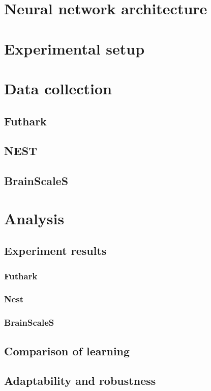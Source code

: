 \documentclass[a4paper,oneside]{memoir}
\begin{document}
\chapter{Neural network architecture} \label{sec:model}
  

\chapter{Experimental setup} \label{sec:experiment}
  

\chapter{Data collection}
  \section{Futhark}
  \section{NEST}
  \section{BrainScaleS}

\chapter{Analysis}
  \section{Experiment results}
  \subsection{Futhark}
  \subsection{Nest}
  \subsection{BrainScaleS}
  \section{Comparison of learning}
  \section{Adaptability and robustness} %
\end{document}

